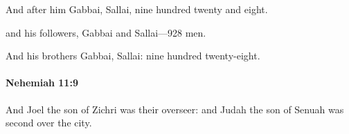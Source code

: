 			\begin{versebox}
					\item[BHS] 
					\item[LXX] 
					\item[ASV] And after him Gabbai, Sallai, nine hundred twenty and eight.
					\item[NIV] and his followers, Gabbai and Sallai—928 men.
					\item[NRSV] And his brothers Gabbai, Sallai: nine hundred twenty-eight.
			\end{versebox}

		\paragraph{Nehemiah 11:9} %
			\label{NEHEMIAH-11-9}

			And Joel the son of Zichri was their overseer: and Judah the son of Senuah was second over the city.

